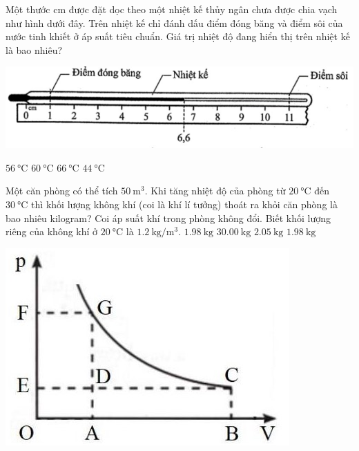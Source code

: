 \begin{ex}
	Một thước $\si{\centi\meter}$ được đặt dọc theo một nhiệt kế thủy ngân chưa được chia vạch như hình dưới đây. Trên nhiệt kế chỉ đánh dấu điểm đóng băng và điểm sôi của nước tinh khiết ở áp suất tiêu chuẩn. Giá trị nhiệt độ đang hiển thị trên nhiệt kế là bao nhiêu?
	\begin{center}
		\includegraphics[width=0.5\linewidth]{../figs/D12-2-1}
	\end{center}
	\choice
	{\True $\SI{56}{\celsius}$}
	{$\SI{60}{\celsius}$}
	{$\SI{66}{\celsius}$}
	{$\SI{44}{\celsius}$}
\end{ex}
\begin{ex}
	Một căn phòng có thể tích $\SI{50}{\meter^3}$. Khi tăng nhiệt độ của phòng từ $\SI{20}{\celsius}$ đến $\SI{30}{\celsius}$ thì khối lượng không khí (coi là khí lí tưởng) thoát ra khỏi căn phòng là bao nhiêu kilogram? Coi áp suất khí trong phòng không đổi. Biết khối lượng riêng của không khí ở $\SI{20}{\celsius}$ là $\SI{1.2}{\kilogram/\meter^3}$.	
	\choice
	{\True $\SI{1.98}{\kilogram}$}
	{$\SI{30.00}{\kilogram}$}
	{$\SI{2.05}{\kilogram}$}
	{$\SI{1.98}{\kilogram}$}
\end{ex}
\begin{ex}
	{
		\includegraphics[width=0.5\linewidth]{../figs/D12-2-2}
	}
\end{ex}
